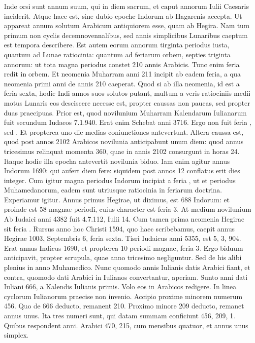 Inde orsi sunt annum suum, qui in
diem sacrum, et caput annorum Iulii Caesaris inciderit.
Atque haec
est, sine dubio epoche Indorum ab Hagarenis accepta.
Ut appareat annum
solutum Arabicum antiquiorem esse, quam ab Hegira.
Nam
tum primum non cyclis decemnovennalibus, sed annis simplicibus
Lunaribus caeptum est tempora describere.
Est autem eorum annorum
tirginta periodus iusta, quantum ad Lunae ratiocinia: quantum ad feriarum
orbem, septies triginta annorum: ut tota magna periodus constet
210 annis Arabicis.
Tunc enim feria redit in orbem.
Et neomenia
Muharram anni 211 incipit ab eadem feria, a qua neomenia primi
anni de annis 210 caeperat.
Quod si ab illa neomenia, id est a feria
sexta, hodie Indi annos suos solutos putant, multum a veris ratiociniis
medii motus Lunaris eos desciscere necesse est, propter caussas non
paucas, sed propter duas praecipuas.
Prior est, quod novilunium Muharram
Kalendarum Iulianarum fuit secundum Iudaeos 7.1.940.
Erat enim Schebat anni 3716.
Ergo non fuit feria , sed .
Et
propterea uno die medias coniunctiones antevertunt.
Altera caussa
est, quod post annos 2102 Arabicos novilunia anticipabunt unum
diem: quod annus tricesimus relinquat momenta 360, quae in annis
2102 consurgunt in horas 24.
Itaque hodie illa epocha antevertit novilunia
biduo.
Iam enim agitur annus Indorum 1690: qui aufert diem
fere: siquidem post annos 12 conflatus erit dies integer.
Cum igitur
magna periodus Indorum incipiat a feria ,
 ut et periodus Muhamedanorum,
eadem sunt utriusque ratiocinia in feriarum doctrina.
Experiamur
igitur.
Annus primus Hegirae, ut diximus, est 688 Indorum: et
proinde est 58 magnae periodi, cuius character est feria 3.
At medium
novilunium Ab Iudaici anni 4382 fuit 4.7.112, Iulii 14.
Cum tamen
prima neomenia Hegirae sit feria .
Rursus anno hoc Christi 1594,
quo haec scribebamus, caepit annus Hegirae 1003, Septembris 6, feria
sexta.
Tisri Iudaicus anni 5355, est 5, 3, 904.
Erat annus Indicus 1690,
et propterea 10 periodi magnae, feria 3.
Ergo biduum anticipavit, propter
scrupula, quae anno tricesimo negliguntur.
Sed de his alibi plenius
in anno Muhamedico.
Nunc quomodo annis Iulianis datis Arabici
fiant, et contra, quomodo dati Arabici in Iulianos convertantur, aperiam.
Sunto anni dati Iuliani 666, a Kalendis Iulianis primis.
Volo eos
in Arabicos redigere.
In linea cyclorum Iulianorum praecise non invenio.
Accipio proxime minorem numerum 456.
Quo de 666 deducto,
remanent 210.
Proximo minore 209 deducto, remanet annus
unus.
Ita tres numeri sunt, qui datam summam conficiunt 456, 209, 1.
Quibus respondent anni.
Arabici 470, 215, cum mensibus
quatuor, et annus unus simplex.

